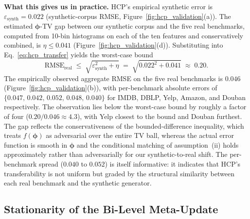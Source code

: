 \documentclass[10pt]{article}
\theoremstyle{plain}
\theoremstyle{definition}
\begin{document}
\textbf{What this gives us in practice.} HCP's empirical synthetic error is $\varepsilon_{\mathrm{synth}}=0.022$ (synthetic-corpus RMSE, Figure~\ref{fig:hcp_validation}(a)). The estimated $\boldsymbol{\phi}$-TV gap between our synthetic corpus and the five real benchmarks, computed from 10-bin histograms on each of the ten features and conservatively combined, is $\eta\le 0.041$ (Figure~\ref{fig:hcp_validation}(d)). Substituting into Eq.~\eqref{eq:hcp_transfer} yields the worst-case bound
\begin{equation*}
\mathrm{RMSE}_{\mathrm{real}}
\;\le\;
\sqrt{\varepsilon_{\mathrm{synth}}^{2}+\eta}
\;=\;
\sqrt{0.022^{2}+0.041}
\;\approx\;
0.20.
\end{equation*}
The empirically observed aggregate RMSE on the five real benchmarks is $0.046$ (Figure~\ref{fig:hcp_validation}(b)), with per-benchmark absolute errors of $\{0.047,\,0.042,\,0.052,\,0.048,\,0.040\}$ for IMDB, DBLP, Yelp, Amazon, and Douban respectively. The observation lies below the worst-case bound by roughly a factor of four ($0.20/0.046\!\approx\!4.3$), with Yelp closest to the bound and Douban furthest. The gap reflects the conservativeness of the bounded-difference inequality, which treats $f(\boldsymbol{\phi})$ as adversarial over the entire TV ball, whereas the actual error function is smooth in $\boldsymbol{\phi}$ and the conditional matching of assumption~(ii) holds approximately rather than adversarially for our synthetic-to-real shift. The per-benchmark spread ($0.040$ to $0.052$) is itself informative: it indicates that HCP's transferability is not uniform but graded by the structural similarity between each real benchmark and the synthetic generator.

\subsection{Stationarity of the Bi-Level Meta-Update}
\label{sec:meta_theory}
\end{document}
